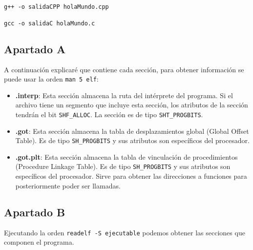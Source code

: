 \documentclass{article}
\begin{document}
\verb|g++ -o salidaCPP holaMundo.cpp|

\verb|gcc -o salidaC holaMundo.c|

\bigskip

\subsection*{Apartado A}
A continuación explicaré que contiene cada sección, para obtener información se puede usar la orden \verb|man 5 elf|:

\begin{itemize}
    \item \textbf{.interp}: Esta sección almacena la ruta del intérprete del programa. Si el archivo tiene un segmento que incluye esta sección, los atributos de la sección tendrán el bit \texttt{SHF\_ALLOC}. La sección es de tipo \texttt{SHT\_PROGBITS}.
    
    \item \textbf{.got}: Esta sección almacena la tabla de desplazamientos global (Global Offset Table). Es de tipo \texttt{SH\_PROGBITS} y sus atributos son específicos del procesador. 
    
    \item \textbf{.got.plt}: Esta sección almacena la tabla de vinculación de procedimientos (Procedure Linkage Table). Es de tipo \texttt{SH\_PROGBITS} y sus atributos son específicos del procesador. Sirve para obtener las direcciones a funciones para posteriormente poder ser llamadas.
\end{itemize}

\newpage

\subsection*{Apartado B}

Ejecutando la orden \verb|readelf -S ejecutable| podemos obtener las secciones que componen el programa.
\end{document}
